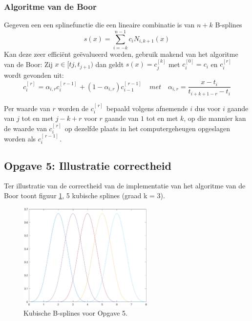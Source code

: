 \documentclass[a4paper]{article}
\newcommand{\opgave}[1]{\subsection{Opgave #1}}
\begin{document}
\subsubsection{Algoritme van de Boor}
Gegeven een een splinefunctie die een lineaire combinatie is van $n+k$ B-splines
\begin{equation}\label{eq:deboor}
	s(x) = \sum\limits_{i=-k}^{n-1} c_iN_{i, k+1}(x)
\end{equation}
Kan deze zeer effici\"ent ge\"evalueerd worden, gebruik makend van het algoritme van de Boor:
Zij $x\in[t{j}, t_{j+1})$ dan geldt $s(x)=c_{j}^{[k]}$ met $c_i^{[0]} = c_i$ en $c_i^{[r]}$ wordt gevonden uit:
\begin{equation}\label{eq:deboorcoef}
	c_i^{[\, r]\, } = \alpha_{i,r} c_i^{[\, r-1]\, } + (1-\alpha_{i,r})c_{i-1}^{[\, r-1]\, } \quad met \quad \alpha_{i,r} = \frac{x-t_i}{t_{i+k+1-r}-t_i}
\end{equation}

Per waarde van $r$ worden de $c_i^{[\, r]\, }$ bepaald volgens afnemende $i$ dus voor $i$ gaande van $j$ tot en met $j-k+r$ voor $r$ gaande van $1$ tot en met $k$, op die mannier kan de waarde van $c_i^{[\, r]\, }$ op dezelfde plaats in het computergeheugen opgeslagen worden als $c_i^{[\, r-1]\, }$.




\opgave{5: Illustratie correctheid}\label{sec:oef5}
Ter illustratie van de correctheid van de implementatie van het algoritme van de Boor toont figuur \ref{fig:splines}, 5 kubische splines (graad k = 3).

\begin{figure}[H]
	\begin{center} 
		\includegraphics[width=0.6\textwidth]{BSplines.eps}
	\end{center}
	\caption{Kubische B-splines voor Opgave 5.}
	\label{fig:splines}
\end{figure}
\newpage
\end{document}
